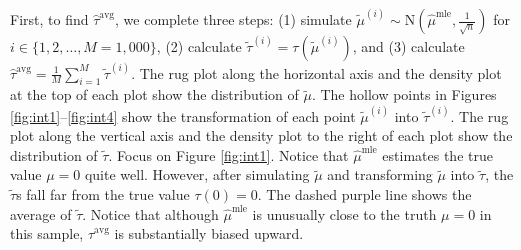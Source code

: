 \documentclass[11pt]{article}
\begin{document}
First, to find $\hat{\tau}^\text{avg}$, we complete three steps: (1) simulate $\tilde{\mu}^{(i)} \sim \text{N} \left( \hat{\mu}^\text{mle}, \frac{1}{\sqrt{n}} \right)$ for $i \in \{1, 2,\ldots, M = 1,000\}$, (2) calculate $\tilde{\tau}^{(i)} = \tau\left( \tilde{\mu}^{(i)} \right)$, and (3) calculate $\hat{\tau}^\text{avg} = \frac{1}{M} \sum_{i = 1}^M \tilde{\tau}^{(i)}$. The rug plot along the horizontal axis and the density plot at the top of each plot show the distribution of $\tilde{\mu}$. The hollow points in Figures \ref{fig:int1}--\ref{fig:int4} show the transformation of each point $\tilde{\mu}^{(i)}$ into $\tilde{\tau}^{(i)}$. The rug plot along the vertical axis and the density plot to the right of each plot show the distribution of $\tilde{\tau}$.
Focus on Figure \ref{fig:int1}. Notice that $\hat{\mu}^\text{mle}$ estimates the true value $\mu = 0$ quite well. However, after simulating $\tilde{\mu}$ and transforming $\tilde{\mu}$ into $\tilde{\tau}$, the $\tilde{\tau}$s fall far from the true value $\tau(0) = 0$. The dashed purple line shows the average of $\tilde{\tau}$. Notice that although $\hat{\mu}^\text{mle}$ is unusually close to the truth $\mu = 0$ in this sample, $\hat{\tau}^\text{avg}$ is substantially biased upward.
\end{document}
